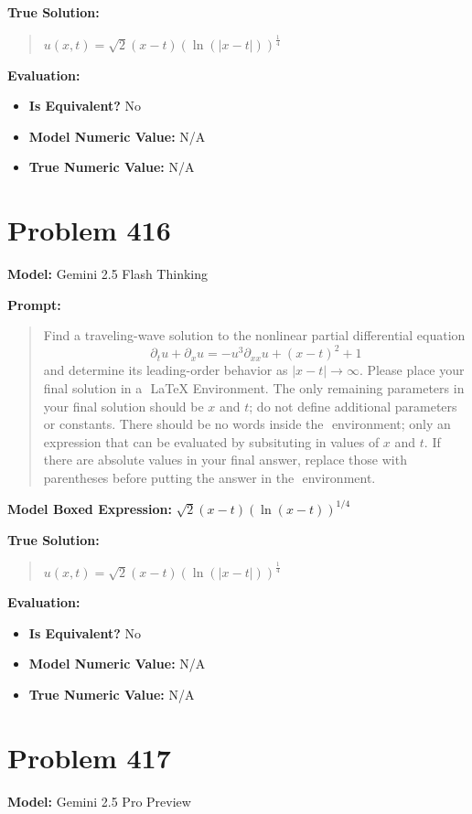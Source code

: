 \documentclass{article}
\begin{document}
\textbf{True Solution:}
\begin{quote}
$u(x,t) = \sqrt{2} (x-t) (\ln(|x-t|))^{\frac{1}{4}}$
\end{quote}

\textbf{Evaluation:}
\begin{itemize}
\item \textbf{Is Equivalent?} No
\item \textbf{Model Numeric Value:} N/A
\item \textbf{True Numeric Value:} N/A
\end{itemize}
\vspace{1cm}
\section*{Problem 416}
\textbf{Model:} Gemini 2.5 Flash Thinking

\textbf{Prompt:}
\begin{quote}
Find a traveling-wave solution to the nonlinear partial differential equation $$\partial_t u + \partial_x u = -u^3 \partial_{xx}u + (x-t)^2 + 1$$ and determine its leading-order behavior as $|x-t| \to \infty$. Please place your final solution in a $\boxed{}$ LaTeX Environment. The only remaining parameters in your final solution should be $x$ and $t$; do not define additional parameters or constants. There should be no words inside the $\boxed{}$ environment; only an expression that can be evaluated by subsituting in values of $x$ and $t$. If there are absolute values in your final answer, replace those with parentheses before putting the answer in the $\boxed{}$ environment.
\end{quote}
\textbf{Model Boxed Expression:} $\sqrt{2}(x-t)(\ln(x-t))^{1/4}$

\textbf{True Solution:}
\begin{quote}
$u(x,t) = \sqrt{2} (x-t) (\ln(|x-t|))^{\frac{1}{4}}$
\end{quote}

\textbf{Evaluation:}
\begin{itemize}
\item \textbf{Is Equivalent?} No
\item \textbf{Model Numeric Value:} N/A
\item \textbf{True Numeric Value:} N/A
\end{itemize}
\vspace{1cm}
\section*{Problem 417}
\textbf{Model:} Gemini 2.5 Pro Preview
\end{document}
